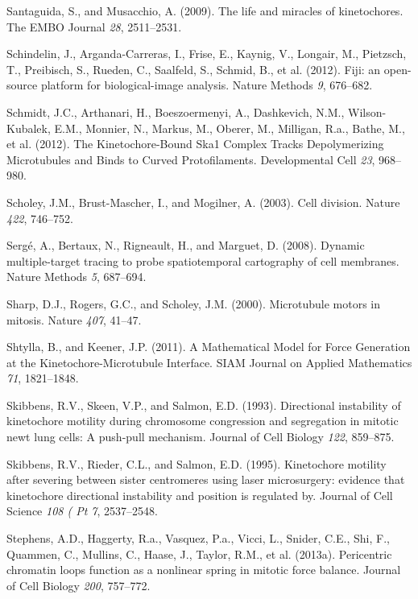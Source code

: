\documentclass[12pt,a4paper,twoside,openright]{book}
\begin{document}
\hypertarget{ref-Santaguida2009a}{}
Santaguida, S., and Musacchio, A. (2009). The life and miracles of
kinetochores. The EMBO Journal \emph{28}, 2511--2531.

\hypertarget{ref-Schindelin2012}{}
Schindelin, J., Arganda-Carreras, I., Frise, E., Kaynig, V., Longair,
M., Pietzsch, T., Preibisch, S., Rueden, C., Saalfeld, S., Schmid, B.,
et al. (2012). Fiji: an open-source platform for biological-image
analysis. Nature Methods \emph{9}, 676--682.

\hypertarget{ref-Schmidt2012}{}
Schmidt, J.C., Arthanari, H., Boeszoermenyi, A., Dashkevich, N.M.,
Wilson-Kubalek, E.M., Monnier, N., Markus, M., Oberer, M., Milligan,
R.a., Bathe, M., et al. (2012). The Kinetochore-Bound Ska1 Complex
Tracks Depolymerizing Microtubules and Binds to Curved Protofilaments.
Developmental Cell \emph{23}, 968--980.

\hypertarget{ref-Scholey2003}{}
Scholey, J.M., Brust-Mascher, I., and Mogilner, A. (2003). Cell
division. Nature \emph{422}, 746--752.

\hypertarget{ref-Serge2008}{}
Sergé, A., Bertaux, N., Rigneault, H., and Marguet, D. (2008). Dynamic
multiple-target tracing to probe spatiotemporal cartography of cell
membranes. Nature Methods \emph{5}, 687--694.

\hypertarget{ref-Sharp2000}{}
Sharp, D.J., Rogers, G.C., and Scholey, J.M. (2000). Microtubule motors
in mitosis. Nature \emph{407}, 41--47.

\hypertarget{ref-Shtylla2011}{}
Shtylla, B., and Keener, J.P. (2011). A Mathematical Model for Force
Generation at the Kinetochore-Microtubule Interface. SIAM Journal on
Applied Mathematics \emph{71}, 1821--1848.

\hypertarget{ref-Skibbens1993}{}
Skibbens, R.V., Skeen, V.P., and Salmon, E.D. (1993). Directional
instability of kinetochore motility during chromosome congression and
segregation in mitotic newt lung cells: A push-pull mechanism. Journal
of Cell Biology \emph{122}, 859--875.

\hypertarget{ref-Skibbens1995}{}
Skibbens, R.V., Rieder, C.L., and Salmon, E.D. (1995). Kinetochore
motility after severing between sister centromeres using laser
microsurgery: evidence that kinetochore directional instability and
position is regulated by. Journal of Cell Science \emph{108 ( Pt 7},
2537--2548.

\hypertarget{ref-Stephens2013}{}
Stephens, A.D., Haggerty, R.a., Vasquez, P.a., Vicci, L., Snider, C.E.,
Shi, F., Quammen, C., Mullins, C., Haase, J., Taylor, R.M., et al.
(2013a). Pericentric chromatin loops function as a nonlinear spring in
mitotic force balance. Journal of Cell Biology \emph{200}, 757--772.
\end{document}
